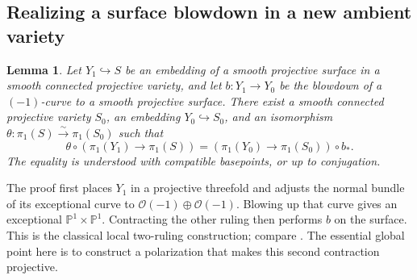 \documentclass[11pt,reqno]{amsart}
\numberwithin{equation}{section}
\newtheorem{lemma}[theorem]{Lemma}
\theoremstyle{definition}
\theoremstyle{remark}
\begin{document}
\subsection{Realizing a surface blowdown in a new ambient variety}

\begin{lemma}\label{lem:ambient-blowdown}
Let $Y_1\hookrightarrow S$ be an embedding of a smooth projective
surface in a smooth connected projective variety, and let
$b:Y_1\to Y_0$ be the blowdown of a $(-1)$-curve to a smooth projective
surface.  There exist a smooth connected projective variety $S_0$, an
embedding $Y_0\hookrightarrow S_0$, and an isomorphism
$\theta:\pi_1(S)\xrightarrow{\sim}\pi_1(S_0)$ such that
\[
 \theta\circ(\pi_1(Y_1)\to\pi_1(S))
 = (\pi_1(Y_0)\to\pi_1(S_0))\circ b_*.
\]
The equality is understood with compatible basepoints, or up to
conjugation.
\end{lemma}

The proof first places $Y_1$ in a projective threefold and adjusts the
normal bundle of its exceptional curve to
$\mathcal O(-1)\oplus\mathcal O(-1)$.  Blowing up that curve gives an
exceptional $\mathbb P^1\times\mathbb P^1$.  Contracting the other ruling then
performs $b$ on the surface.  This is the classical local two-ruling
construction; compare \cite{Atiyah1958}.  The essential global point
here is to construct a polarization that makes this second contraction
projective.
\end{document}
